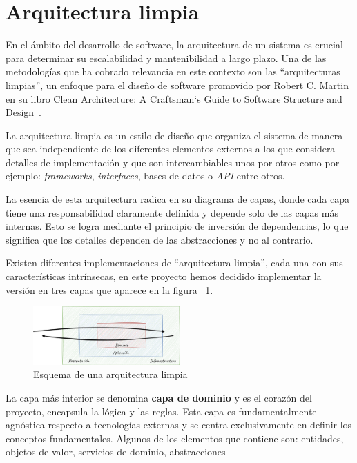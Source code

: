 \section{Arquitectura limpia}\label{sec:clean_architecture}

En el ámbito del desarrollo de software, la arquitectura de un sistema es crucial para determinar su escalabilidad y
mantenibilidad a largo plazo.
Una de las metodologías que ha cobrado relevancia en este contexto son las ``arquitecturas limpias'', un enfoque para el
diseño de software promovido por Robert C. Martin en su libro Clean Architecture: A Craftsman`s Guide to Software
Structure and Design~\cite{book_martin_2017}.

La arquitectura limpia es un estilo de diseño que organiza el sistema de manera que sea independiente de los diferentes
elementos externos a los que considera detalles de implementación y que son intercambiables unos por otros como por
ejemplo: \textit{frameworks}, \textit{interfaces}, bases de datos o \textit{API} entre otros.

La esencia de esta arquitectura radica en su diagrama de capas, donde cada capa tiene una responsabilidad claramente
definida y depende solo de las capas más internas.
Esto se logra mediante el principio de inversión de dependencias, lo que significa que los detalles dependen de las
abstracciones y no al contrario.

Existen diferentes implementaciones de ``arquitectura limpia'', cada una con sus características intrínsecas, en este
proyecto hemos decidido implementar la versión en tres capas que aparece en la figura
~\ref{fig:chapter_2.clean_architecture}.

\begin{figure}[ht]
    \begin{center}
        \includegraphics[width=0.5\textwidth]{./chapter/2/images/chapter_2.clean_architecture}
        \caption{Esquema de una arquitectura limpia}
        \label{fig:chapter_2.clean_architecture}
    \end{center}
\end{figure}

La capa más interior se denomina \textbf{capa de dominio} y es el corazón del proyecto, encapsula la lógica y las
reglas.
Esta capa es fundamentalmente agnóstica respecto a tecnologías externas y se centra exclusivamente en definir los
conceptos fundamentales.
Algunos de los elementos que contiene son: entidades, objetos de valor, servicios de dominio, abstracciones

